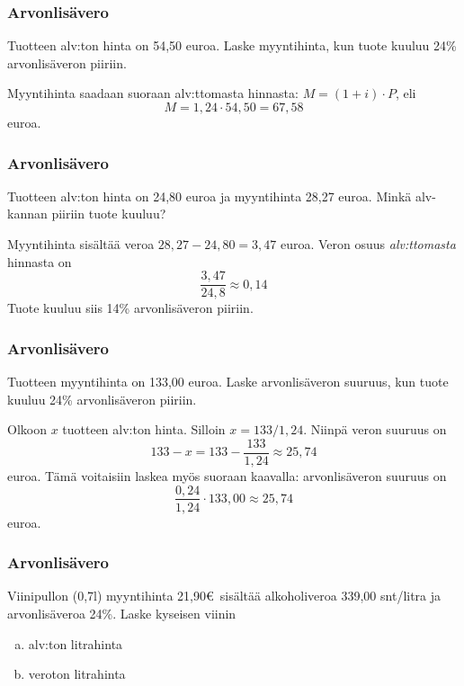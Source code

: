 \documentclass[handout]{beamer}
\begin{document}
\begin{frame}
\frametitle{Arvonlisävero}
	\begin{esim}
		Tuotteen alv:ton hinta on 54,50 euroa. Laske myyntihinta, kun tuote kuuluu 24\% arvonlisäveron piiriin.
	\end{esim}
	\pause
	\begin{ratkaisu}
		Myyntihinta saadaan suoraan alv:ttomasta hinnasta: \(M = (1+i)\cdot P\), eli \pause 
	\[
		M = 1,24\cdot 54,50 = 67,58
	\] euroa.
	\end{ratkaisu}
\end{frame}


\begin{frame}
\frametitle{Arvonlisävero}
	\begin{esim}
		Tuotteen alv:ton hinta on 24,80 euroa ja myyntihinta 28,27 euroa. Minkä alv-kannan piiriin tuote kuuluu?
	\end{esim}
	\pause
	\begin{ratkaisu}
		Myyntihinta sisältää veroa  \(28,27-24,80 = 3,47\) euroa.\pause
		Veron osuus \emph{alv:ttomasta} hinnasta on 
		\[
			\frac{3,47}{24,8} \approx 0,14
		\]
		\pause
		Tuote kuuluu siis 14\% arvonlisäveron piiriin.
	\end{ratkaisu}
\end{frame}

\begin{frame}
\frametitle{Arvonlisävero}
	\begin{esim}
		Tuotteen myyntihinta on 133,00 euroa. Laske arvonlisäveron suuruus, kun tuote kuuluu 24\% arvonlisäveron piiriin.
	\end{esim}
	\pause
	\begin{ratkaisu}
		Olkoon \(x\) tuotteen alv:ton hinta. \pause Silloin \(x= 133/1,24\). \pause Niinpä veron suuruus on \pause
		\[
			133- x = 133 - \frac{133}{1,24}\approx 25,74
		\]
		euroa. \pause Tämä voitaisiin laskea myös suoraan kaavalla: arvonlisäveron suuruus on \pause
			\[
				\frac{0,24}{1,24}\cdot133,00\approx 25,74
			\]
		euroa.
	\end{ratkaisu}
\end{frame}

\begin{frame}
\frametitle{Arvonlisävero}
	\begin{esim}
		Viinipullon (0,7l) myyntihinta 21,90\euro\ sisältää alkoholiveroa 339,00 snt/litra ja arvonlisäveroa 24\%. Laske kyseisen viinin
		\begin{enumerate}[(a)]
			\item alv:ton litrahinta
			\item veroton litrahinta
		\end{enumerate}
	\end{esim}
\end{frame}
\end{document}
